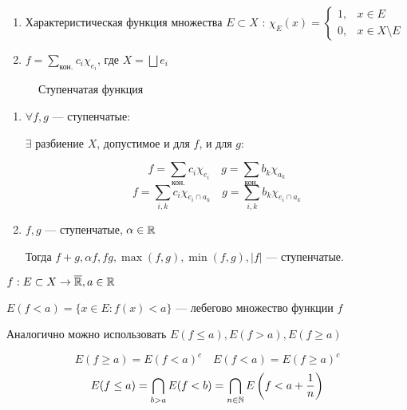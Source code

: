 \begin{example}\itemfix
    \begin{enumerate}
        \item Характеристическая функция множества \(E\subset X\) : \(\chi_E(x) = \begin{cases}
                  1, & x\in E            \\
                  0, & x\in X\setminus E
              \end{cases}\)
        \item \(f = \sum\limits_{\text{кон.}} c_i \chi_{e_i}\), где \(X = \bigsqcup e_i\)
    \end{enumerate}
\end{example}

\begin{figure}[h]
    \centering
    
    \caption{Ступенчатая функция}
\end{figure}

\begin{prop}\itemfix
    \begin{enumerate}
        \item \(\forall f, g\) --- ступенчатые:

              \(\exists \) разбиение \(X\), допустимое и для \(f\), и для \(g\):

              \[f = \sum\limits_{\text{кон.}} c_i \chi_{e_i} \quad g = \sum\limits_{\text{кон.}} b_k \chi_{a_k}\]
              \[f = \sum\limits_{i, k} c_i \chi_{e_i \cap a_k} \quad g = \sum\limits_{i, k} b_k \chi_{e_i \cap a_k}\]
        \item \(f, g\) --- ступенчатые, \(\alpha\in\mathbb{R}\)

              Тогда \(f + g, \alpha f, fg, \max(f, g), \min(f, g), |f|\) --- ступенчатые.
    \end{enumerate}
\end{prop}

\begin{definition}
    \(f : E\subset X \to \overline {\mathbb{R}}, a\in\mathbb{R}\)

    \(E(f < a) = \{x\in E : f(x) < a\} \) --- лебегово множество функции \(f\)

    Аналогично можно использовать \(E(f \leq a), E(f > a), E(f \geq a)\)
\end{definition}

\begin{remark}
    \[E(f \geq a) = E(f < a)^c \quad E(f < a) = E(f \geq a)^c\]
    \[E(f \leq a) = \bigcap_{b > a} E(f < b) = \bigcap_{n\in\mathbb{N}} E\left(f < a + \frac{1}{n}\right)\]
\end{remark}

